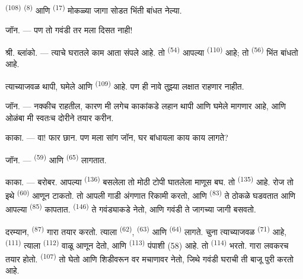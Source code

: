  \textsuperscript{(108)}  \textsuperscript{(8)} आणि  \textsuperscript{(17)} मोकळ्या जागा सोडत भिंती बांधत नेल्या.

\textsc{जॉन}. --- पण तो गवंडी तर मला दिसत नाही!

श्री. \textsc{ब्लांको}. --- त्याचे घरातले काम आता संपले आहे. तो 
\textsuperscript{(54)} आपल्या  \textsuperscript{(110)} आहे; तो
 \textsuperscript{(56)} भिंत बांधतो आहे.

त्याच्याजवळ थापी, घमेले आणि  \textsuperscript{(109)} आहे. पण ही नावे तुझ्या
लक्षात राहणार नाहीत.

\textsc{जॉन}. --- नक्कीच राहतील, कारण मी लगेच काकांकडे लहान थापी आणि घमेले मागणार आहे, आणि
ओळंबा मी स्वतःच दोरीने तयार करीन.

\VUsaut{3.0mm}
\VUsaut{3.0mm}

\textsc{काका}. --- वा! फार छान. पण मला सांग जॉन, घर बांधायला काय काय लागते?

\textsc{जॉन}. ---  \textsuperscript{(59)} आणि 
\textsuperscript{(65)} लागतात.

\textsc{काका}. --- बरोबर. आपल्या  \textsuperscript{(136)} बसलेला तो मोठी टोपी
घातलेला माणूस बघ. तो  \textsuperscript{(135)} आहे. रोज तो इथे
 \textsuperscript{(60)} आणून टाकतो. तो आपली गाडी अंगणात रिकामी करतो, आणि
 \textsuperscript{(83)} ते ठोकळे घडवतात आणि आपल्या 
\textsuperscript{(85)} कापतात.  \textsuperscript{(146)} ते गवंड्याकडे नेतो, आणि
गवंडी ते जागच्या जागी बसवतो.

दरम्यान,  \textsuperscript{(87)} गारा तयार करतो. त्याला 
\textsuperscript{(62)},  \textsuperscript{(63)} आणि 
\textsuperscript{(64)} लागते. चुना त्याच्याजवळ  \textsuperscript{(71)} आहे,
 \textsuperscript{(111)} त्याला 
\textsuperscript{(112)} वाळू आणून देतो, आणि  \textsuperscript{(113)}
पंपाशी (58) आहे. तो  \textsuperscript{(114)} भरतो. गारा लवकरच तयार होतो.
 \textsuperscript{(107)} तो घेतो आणि शिडीवरून वर मचाणावर नेतो, जिथे गवंडी
घराची ती बाजू पुरी करतो आहे.

